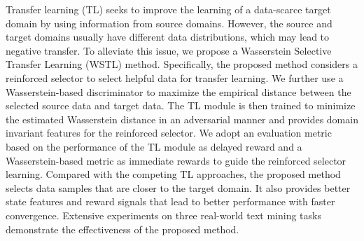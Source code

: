 Transfer learning (TL) seeks to improve the learning of a data-scarce target domain by using information from source domains. However, the source and target domains usually have different data distributions, which may lead to negative transfer. To alleviate this issue, we propose a Wasserstein Selective Transfer Learning (WSTL) method. Specifically, the proposed method considers a reinforced selector to select helpful data for transfer learning. We further use a Wasserstein-based discriminator to maximize the empirical distance between the selected source data and target data. The TL module is then trained to minimize the estimated Wasserstein distance in an adversarial manner and provides domain invariant features for the reinforced selector. We adopt an evaluation metric based on the performance of the TL module as delayed reward and a Wasserstein-based metric as immediate rewards to guide the reinforced selector learning. Compared with the competing TL approaches, the proposed method selects data samples that are closer to the target domain. It also provides better state features and reward signals that lead to better performance with faster convergence. Extensive experiments on three real-world text mining tasks demonstrate the effectiveness of the proposed method.
